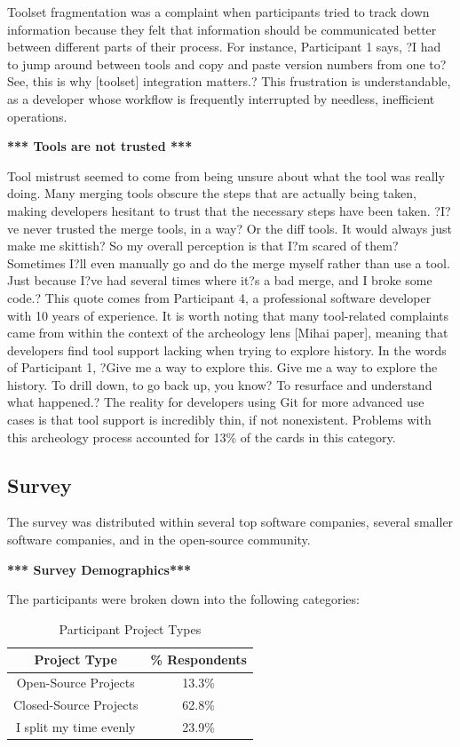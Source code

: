 \documentclass[conference]{IEEEtran}
\begin{document}
Toolset fragmentation was a complaint when participants tried to track down information because they felt that information should be communicated better between different parts of their process. For instance, Participant 1 says, ?I had to jump around between tools and copy and paste version numbers from one to? See, this is why [toolset] integration matters.? This frustration is understandable, as a developer whose workflow is frequently interrupted by needless, inefficient operations.

\textbf{*** Tools are not trusted ***}

Tool mistrust seemed to come from being unsure about what the tool was really doing. Many merging tools obscure the steps that are actually being taken, making developers hesitant to trust that the necessary steps have been taken. ?I?ve never trusted the merge tools, in a way? Or the diff tools. It would always just make me skittish? So my overall perception is that I?m scared of them? Sometimes I?ll even manually go and do the merge myself rather than use a tool. Just because I?ve had several times where it?s a bad merge, and I broke some code.? This quote comes from Participant 4, a professional software developer with 10 years of experience. 
It is worth noting that many tool-related complaints came from within the context of the archeology lens [Mihai paper], meaning that developers find tool support lacking when trying to explore history. In the words of Participant 1, ?Give me a way to explore this. Give me a way to explore the history. To drill down, to go back up, you know? To resurface and understand what happened.? The reality for developers using Git for more advanced use cases is that tool support is incredibly thin, if not nonexistent. Problems with this archeology process accounted for 13\% of the cards in this category.

\subsection{Survey}

The survey was distributed within several top software companies, several smaller software companies, and in the open-source community.

\textbf{*** Survey Demographics***}

The participants were broken down into the following categories:

\begin{table}[!t]
\renewcommand{\arraystretch}{1.3}
\caption{Participant Project Types}
\label{project_type}
\centering
\begin{tabular}{|c||c|}
\hline
Project Type & \% Respondents\\
\hline
Open-Source Projects & 13.3\%\\
Closed-Source Projects & 62.8\%\\
I split my time evenly & 23.9\%\\
\hline
\end{tabular}
\end{table}
\end{document}
